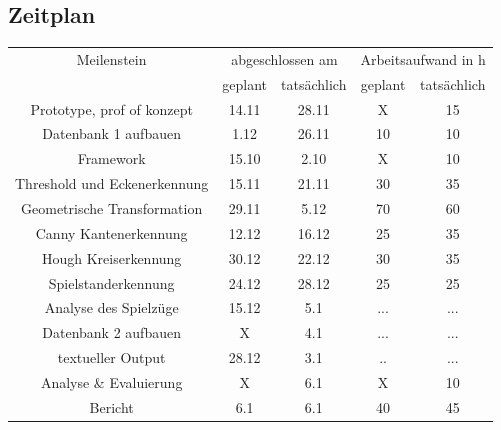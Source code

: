 \documentclass[paper=A4, deutsch]{scrartcl}
\begin{document}
\subsection{Zeitplan}

\begin{table}[h!]
	\centering
	\begin{tabular}{|c|c|c|c|c|}
		\hline
		Meilenstein & \multicolumn{2}{c|}{abgeschlossen am} & \multicolumn{2}{c|}{Arbeitsaufwand in h}\\
		\cline{2-5}
		 & geplant & tatsächlich & geplant & tatsächlich\\
		\hline
				Prototype, prof of konzept & 14.11 & 28.11 & X & 15\\
		\hline
				Datenbank 1 aufbauen & 1.12 & 26.11 & 10 & 10\\
		\hline
				Framework &15.10 &2.10 & X & 10\\
		\hline	
				Threshold und Eckenerkennung & 15.11 & 21.11 & 30 &35\\
		\hline	
				Geometrische Transformation & 29.11 & 5.12 & 70 &60\\
		\hline	
				Canny Kantenerkennung & 12.12 & 16.12 & 25 & 35\\
		\hline	
				Hough Kreiserkennung & 30.12 & 22.12 & 30 & 35\\
		\hline	
				Spielstanderkennung & 24.12 & 28.12 & 25 & 25\\
		\hline	
				Analyse des Spielzüge & 15.12 & 5.1 &... &...\\
		\hline	
				Datenbank 2 aufbauen & X & 4.1 &... &...\\
		\hline
				textueller Output & 28.12 &  3.1 &..&... \\
		\hline 
				Analyse \& Evaluierung & X & 6.1 & X & 10\\
		\hline
				Bericht & 6.1 & 6.1 & 40 & 45\\
		\hline
	\end{tabular}
\end{table}

\end{document}
